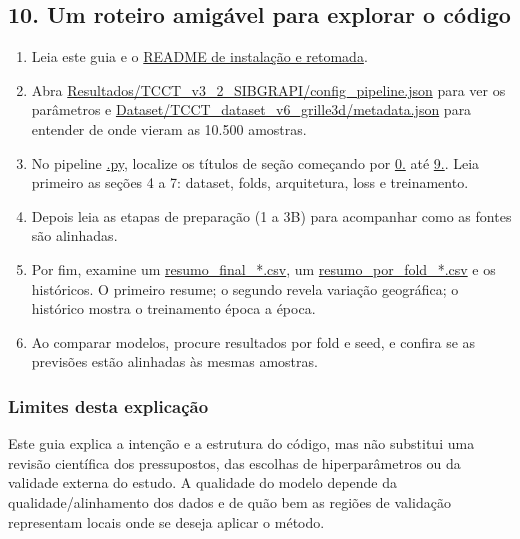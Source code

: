 \documentclass[11pt,a4paper]{article}
\begin{document}
\subsection{10. Um roteiro amigável para explorar o código}
\begin{enumerate}
\item Leia este guia e o \href{README_TCCT_v3_2_1_RETOMADA.md}{README de instalação e retomada}.
\item Abra \url{Resultados/TCCT_v3_2_SIBGRAPI/config_pipeline.json} para ver os parâmetros e \url{Dataset/TCCT_dataset_v6_grille3d/metadata.json} para entender de onde vieram as 10.500 amostras.
\item No pipeline \url{.py}, localize os títulos de seção começando por \url{0.} até \url{9.}. Leia primeiro as seções 4 a 7: dataset, folds, arquitetura, loss e treinamento.
\item Depois leia as etapas de preparação (1 a 3B) para acompanhar como as fontes são alinhadas.
\item Por fim, examine um \url{resumo_final_*.csv}, um \url{resumo_por_fold_*.csv} e os históricos. O primeiro resume; o segundo revela variação geográfica; o histórico mostra o treinamento época a época.
\item Ao comparar modelos, procure resultados por fold e seed, e confira se as previsões estão alinhadas às mesmas amostras.
\end{enumerate}
\subsubsection{Limites desta explicação}
Este guia explica a intenção e a estrutura do código, mas não substitui uma revisão científica dos pressupostos, das escolhas de hiperparâmetros ou da validade externa do estudo. A qualidade do modelo depende da qualidade/alinhamento dos dados e de quão bem as regiões de validação representam locais onde se deseja aplicar o método.
\end{document}

